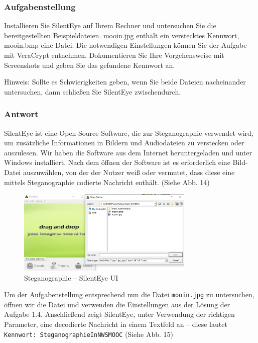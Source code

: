 \documentclass{article}
\begin{document}
\subsubsection*{Aufgabenstellung}

Installieren Sie SilentEye  auf Ihrem Rechner und untersuchen Sie die 
bereitgestellten Beispieldateien. mooin.jpg enthält ein verstecktes Kennwort, 
mooin.bmp eine Datei. Die notwendigen Einstellungen können Sie der Aufgabe mit 
VeraCrypt entnehmen. Dokumentieren Sie Ihre Vorgehensweise mit Screenshots und 
geben Sie das gefundene Kennwort an.

Hinweis: Sollte es Schwierigkeiten geben, wenn Sie beide Dateien nacheinander 
untersuchen, dann schließen Sie SilentEye zwischendurch.

\subsubsection*{Antwort}

SilentEye ist eine Open-Source-Software, die zur Steganographie verwendet wird, um 
zusätzliche Informationen in Bildern und Audiodateien zu verstecken oder auszulesen.
Wir haben die Software aus dem Internet heruntergeladen und unter Windows 
installiert. Nach dem öffnen der Software ist es erforderlich eine Bild-Datei 
auszuwählen, von der der Nutzer weiß oder vermutet, dass diese eine mittels 
Steganographie codierte Nachricht enthält. (Siehe Abb. 14)


\begin{figure}[H]
	\includegraphics[width=0.75\textwidth]{images/14}
	\centering
	\caption{Steganographie – SilentEye UI}
\end{figure}

Um der Aufgabenstellung entsprechend nun die Datei \texttt{mooin.jpg} zu untersuchen, 
öffnen wir die Datei und verwenden die Einstellungen aus der Lösung der Aufgabe 1.4. 
Anschließend zeigt SilentEye, unter Verwendung der richtigen Parameter, eine 
decodierte Nachricht in einem Textfeld an – diese lautet
\texttt{Kennwort: SteganographieInNWSMOOC} (Siehe Abb. 15)
\end{document}

